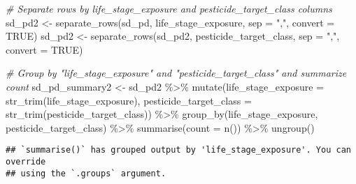 \documentclass[
]{article}
\newenvironment{Shaded}{\begin{snugshade}}{\end{snugshade}}
\newcommand{\AttributeTok}[1]{\textcolor[rgb]{0.77,0.63,0.00}{#1}}
\newcommand{\CommentTok}[1]{\textcolor[rgb]{0.56,0.35,0.01}{\textit{#1}}}
\newcommand{\ConstantTok}[1]{\textcolor[rgb]{0.00,0.00,0.00}{#1}}
\newcommand{\FunctionTok}[1]{\textcolor[rgb]{0.00,0.00,0.00}{#1}}
\newcommand{\NormalTok}[1]{#1}
\newcommand{\OtherTok}[1]{\textcolor[rgb]{0.56,0.35,0.01}{#1}}
\newcommand{\SpecialCharTok}[1]{\textcolor[rgb]{0.00,0.00,0.00}{#1}}
\newcommand{\StringTok}[1]{\textcolor[rgb]{0.31,0.60,0.02}{#1}}
\begin{document}
\begin{Shaded}
\begin{Highlighting}[]
\CommentTok{\# Separate rows by life\_stage\_exposure and pesticide\_target\_class columns}
\NormalTok{sd\_pd2 }\OtherTok{\textless{}{-}} \FunctionTok{separate\_rows}\NormalTok{(sd\_pd, life\_stage\_exposure, }\AttributeTok{sep =} \StringTok{","}\NormalTok{, }\AttributeTok{convert =} \ConstantTok{TRUE}\NormalTok{)}
\NormalTok{sd\_pd2 }\OtherTok{\textless{}{-}} \FunctionTok{separate\_rows}\NormalTok{(sd\_pd2, pesticide\_target\_class, }\AttributeTok{sep =} \StringTok{","}\NormalTok{, }\AttributeTok{convert =} \ConstantTok{TRUE}\NormalTok{)}

\CommentTok{\# Group by "life\_stage\_exposure" and "pesticide\_target\_class" and summarize count}
\NormalTok{sd\_pd\_summary2 }\OtherTok{\textless{}{-}}\NormalTok{ sd\_pd2 }\SpecialCharTok{\%\textgreater{}\%}
  \FunctionTok{mutate}\NormalTok{(}\AttributeTok{life\_stage\_exposure =} \FunctionTok{str\_trim}\NormalTok{(life\_stage\_exposure),}
         \AttributeTok{pesticide\_target\_class =} \FunctionTok{str\_trim}\NormalTok{(pesticide\_target\_class)) }\SpecialCharTok{\%\textgreater{}\%}
  \FunctionTok{group\_by}\NormalTok{(life\_stage\_exposure, pesticide\_target\_class) }\SpecialCharTok{\%\textgreater{}\%}
  \FunctionTok{summarise}\NormalTok{(}\AttributeTok{count =} \FunctionTok{n}\NormalTok{()) }\SpecialCharTok{\%\textgreater{}\%}
  \FunctionTok{ungroup}\NormalTok{()}
\end{Highlighting}
\end{Shaded}

\begin{verbatim}
## `summarise()` has grouped output by 'life_stage_exposure'. You can override
## using the `.groups` argument.
\end{verbatim}
\end{document}
